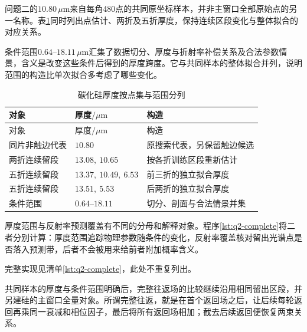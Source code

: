 问题二的$10.80\,\mu\mathrm{m}$来自每角480点的共同原坐标样本，并非主窗口全部原始点的另一名称。表\ref{tab:app-q2}同时列出点估计、两折及五折厚度，保持连续区段变化与整体拟合的对应关系。

条件范围$0.64$--$18.11\,\mu\mathrm{m}$汇集了数据切分、厚度与折射率补偿关系及合法参数情景，含义是改变这些条件后得到的厚度跨度。它与共同样本的整体拟合并列，说明范围的构造比单次拟合多考虑了哪些变化。

\begingroup
\small
\begin{longtable}{>{\centering\arraybackslash}p{}>{\centering\arraybackslash}p{}>{\centering\arraybackslash}p{}}
\caption{碳化硅厚度按点集与范围分列}\label{tab:app-q2}\\
\toprule
对象 & 厚度$/\mu\mathrm{m}$ & 构造 \\
\midrule
\endfirsthead
\toprule
对象 & 厚度$/\mu\mathrm{m}$ & 构造 \\
\midrule
\endhead
\bottomrule
\endfoot
同片非触边代表 & $10.80$ & 原搜索代表，另保留触边候选 \\
两折连续留段 & $13.08,\ 10.65$ & 按各折训练区段重新估计 \\
五折连续留段 & $13.37,\ 10.49,\ 6.53$ & 前三折的独立拟合厚度 \\
五折连续留段 & $13.51,\ 5.53$ & 后两折的独立拟合厚度 \\
条件范围 & $0.64$--$18.11$ & 切分、剖面与合法情景并集 \\
\end{longtable}
\endgroup

厚度范围与反射率预测覆盖有不同的分母和解释对象。程序\ref{lst:q2-complete}将二者分别计算：厚度范围追踪物理参数随条件的变化，反射率覆盖核对留出光谱点是否落入预测带，后者不会被用来给前者附加概率含义。

\begingroup
{}
完整实现见清单\ref{lst:q2-complete}，此处不重复列出。
\endgroup

共同样本的厚度与条件范围明确后，完整往返场的比较继续沿用相同留出区段，并另建硅的主窗口全量对象。所谓完整往返，就是在首个返回场之后，让后续每轮返回再乘同一衰减和相位因子，最后将所有返回场相加；截去后续返回便恢复两束关系。


